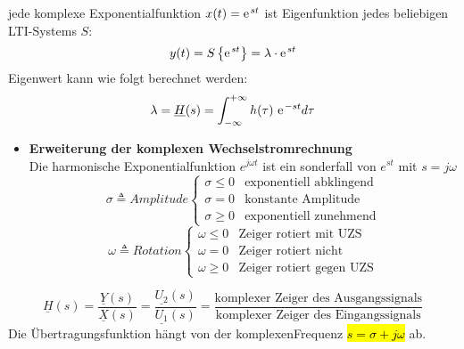\begin{mdframed}[style=exercise]
  jede komplexe Exponentialfunktion $x(t) = \e^{st}$ ist Eigenfunktion
  jedes beliebigen LTI-Systems $S$:
  \[
      y(t) = S\left\{ \e^{st} \right\} = \lambda\cdot \e^{st}
  \]
  Eigenwert kann wie folgt berechnet werden:
  \[
      \lambda = \underline{H}(s) = \int_{-\infty}^{+\infty} h(\tau)\  \e^{-st} d\tau
  \]
  \begin{itemize}
      \item{\textbf{Erweiterung der komplexen Wechselstromrechnung}}\\
          Die harmonische Exponentialfunktion $e^{j\omega t}$ ist ein
          sonderfall von $e^{st}$ mit $s=j\omega$
          \[
              \sigma \triangleq Amplitude
              \begin{cases}
                  \sigma \leq 0 & \text{exponentiell abklingend}\\
                  \sigma = 0 & \text{konstante Amplitude}\\
                  \sigma \geq 0 & \text{exponentiell zunehmend}
              \end{cases}
          \]
          \[
              \omega \triangleq Rotation
              \begin{cases}
                  \omega \leq 0 & \text{Zeiger rotiert mit UZS}\\
                  \omega = 0 & \text{Zeiger rotiert nicht}\\
                  \omega \geq 0 & \text{Zeiger rotiert gegen UZS}
              \end{cases}
          \]
  \end{itemize}
\end{mdframed}

\begin{mdframed}[style=exercise,frametitle=Komplexe \"Ubertragungsfunktion]
  \footnotesize
  \[
      \underline{H}(s)=\frac{\underline{Y}(s)}{\underline{X}(s)}=\frac{\underline{U_2}(s)}{\underline{U_1}(s)}=\frac{\text{komplexer
      Zeiger des Ausgangssignals}}{\text{komplexer Zeiger des
      Eingangssignals}}
  \]
  \normalsize
  Die Übertragungsfunktion hängt von der komplexen\linebreak Frequenz
  \hl{$s=\sigma+j\omega$} ab.
\end{mdframed}
